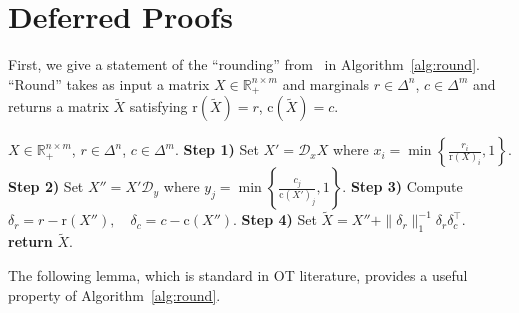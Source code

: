 \documentclass[10pt]{article}
\newcommand{\R}{\mathbb{R}}
\newcommand{\Rp}{\R_{+}}
\newcommand{\LSE}{\mathrm{LSE}}
\newcommand{\diag}[1]{\mathcal{D}_{#1}}
\theoremstyle{plain}
\theoremstyle{definition}
\theoremstyle{remark}
\newcommand{\col}{\bm{\mathrm{c}}}
\newcommand{\row}{\bm{\mathrm{r}}}
\begin{document}
\section{Deferred Proofs}\label{appdx:deferred}


First, we give a statement of the ``rounding'' from~\cite{altschulerNearlinearTimeApproximation2017} in Algorithm~\ref{alg:round}. ``Round'' takes as input a matrix $X\in\Rp^{n\times m}$ and marginals $r\in\Delta^n$, $c\in\Delta^m$ and returns a matrix $\tilde X$ satisfying $\row(\tilde{X})=r$, $\col(\tilde X)=c$.

\begin{algorithm}[H]\caption{Round{~\cite[Algorithm 2]{altschulerNearlinearTimeApproximation2017}}}\label{alg:round}
\begin{algorithmic}
    \REQUIRE $X\in\Rp^{n\times m}$, $r\in\Delta^n$, $c\in\Delta^m$.
    \STATE \textbf{Step 1)} Set $X'=\diag{x}X$ where
    $x_i=\min\left\{\frac{r_i}{\row(X)_i}, 1\right\}$.
    \STATE \textbf{Step 2)} Set $X''=X'\diag{y}$ where
    $y_j=\min\left\{\frac{c_j}{\col(X')_j}, 1\right\}$.
    \STATE \textbf{Step 3)} Compute
    $\delta_r=r-\row(X''),\quad \delta_c=c-\col(X'')$.
    \STATE \textbf{Step 4)} Set $\tilde X=X''+\|\delta_r\|_1^{-1}\delta_r\delta_c^\top$.
    \STATE \textbf{return} $\tilde X$.
\end{algorithmic}
\end{algorithm}

The following lemma, which is standard in OT literature, provides a useful property of Algorithm~\ref{alg:round}.
\end{document}
